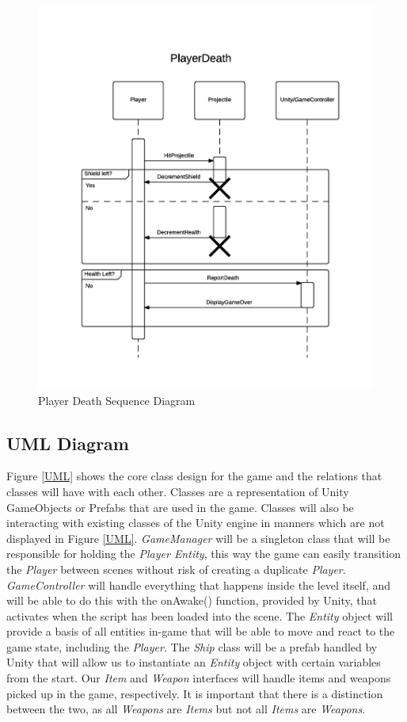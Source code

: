 \documentclass[12pt]{article}       %
\def\hs{\hspace{15pt}}
\begin{document}
\begin{figure} [H]
\centering
\includegraphics[width=4.75in]{PlayerDeath.png}
\caption{Player Death Sequence Diagram} \label{PlayerDeath}
\end{figure}

\subsection{UML Diagram}
\hs Figure \ref{UML} shows the core class design for the game and the relations that classes will have with each other. Classes are a representation of Unity GameObjects or Prefabs that are used in the game. Classes will also be interacting with existing classes of the Unity engine in manners which are not displayed in Figure \ref{UML}. {\it GameManager} will be a singleton class that will be responsible for holding the {\it Player Entity}, this way the game can easily transition the {\it Player} between scenes without risk of creating a duplicate {\it Player}. {\it GameController} will handle everything that happens inside the level itself, and will be able to do this with the onAwake() function, provided by Unity, that activates when the script has been loaded into the scene. The {\it Entity} object will provide a basis of all entities in-game that will be able to move and react to the game state, including the {\it Player}. The {\it Ship} class will be a prefab handled by Unity that will allow us to instantiate an {\it Entity} object with certain variables from the start. Our {\it Item} and {\it Weapon} interfaces will handle items and weapons picked up in the game, respectively. It is important that there is a distinction between the two, as all {\it Weapons} are {\it Items} but not all {\it Items} are {\it Weapons}.
\end{document}
